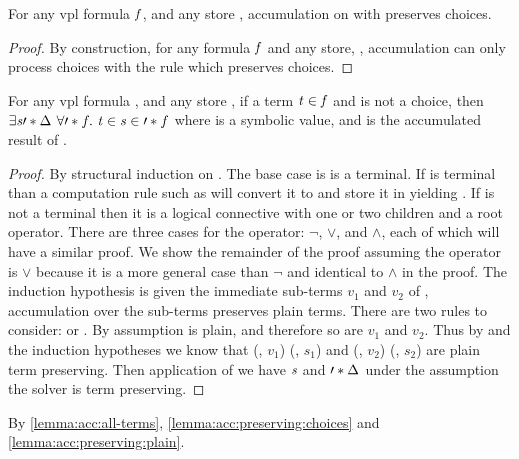 \begin{lemma}
  \label{lemma:acc:preserving:choices}
  For any \ac{vpl} formula $\mathit{f}$, and any store \aStore{}, accumulation on
  \fV{} with \aStore{} preserves choices.
\end{lemma}
%
\begin{proof}
  By construction, for any formula $\mathit{f}$ and any store, \aStore{},
  accumulation can only process choices with the \acChc{} rule which preserves
  choices.
\end{proof}

\begin{lemma}
  \label{lemma:acc:preserving:plain}
  For any \ac{vpl} formula \fV, and any store \aStore{}, if a term $\mathit{t}{} \in
  \mathit{f}$ and \tV{} is not a choice, then $\exists\sV{}\prime*{\aStore{}}\ \forall\prime*{f}.\ \tV
  \in \sV{} \in \prime*{f}$ where \sV{} is a symbolic value, and  is
  the accumulated result of \fV{}.
\end{lemma}
%
\begin{proof}
  By structural induction on \tV{}. The base case is \tV{} is a terminal. If
  \tV{} is terminal than a computation rule such as \acRef{} will convert it to
  \sV{} and store it in \aStore{} yielding \prime*{\aStore{}}. If \tV{} is not a
  terminal then it is a logical connective with one or two children and a root
  operator. There are three cases for the operator: $\neg$, $\vee$, and
  $\wedge$, each of which will have a similar proof. We show the remainder of
  the proof assuming the operator is $\vee$ because it is a more general case
  than $\neg$ and identical to $\wedge$ in the proof. The induction hypothesis
  is given the immediate sub-terms $v_{1}$ and $v_{2}$ of \tV{}, accumulation
  over the sub-terms preserves plain terms. There are two rules to consider:
  \acOrS{} or \acOrV{}. By assumption \tV{} is plain, and therefore so are
  $v_{1}$ and $v_{2}$. Thus by \acOrS{} and the induction hypotheses we know
  that (\aStore{}, $v_1$) \accumulation (, $s_1$) and (,
  $v_2$) \accumulation (, $s_2$) are plain term preserving. Then
  application of \por{} we have $\mathit{s}$ and $\prime*{\Delta_{}}$ under the
  assumption the solver is term preserving.
\end{proof}
%
\begin{theorem}
  By \autoref{lemma:acc:all-terms}, \autoref{lemma:acc:preserving:choices} and
  \autoref{lemma:acc:preserving:plain}.
\end{theorem}


